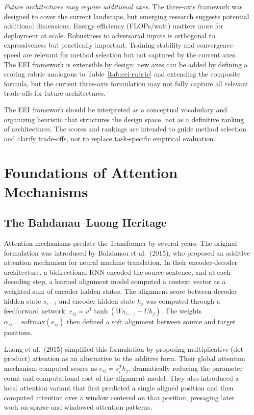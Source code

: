 \documentclass[10pt,twocolumn]{article}
\begin{document}
\textit{Future architectures may require additional axes.} The three-axis framework was designed to cover the current landscape, but emerging research suggests potential additional dimensions. Energy efficiency (FLOPs/watt) matters more for deployment at scale. Robustness to adversarial inputs is orthogonal to expressiveness but practically important. Training stability and convergence speed are relevant for method selection but not captured by the current axes. The EEI framework is extensible by design: new axes can be added by defining a scoring rubric analogous to Table~\ref{tab:eei-rubric} and extending the composite formula, but the current three-axis formulation may not fully capture all relevant trade-offs for future architectures.

\noindent The EEI framework should be interpreted as a conceptual vocabulary and organizing heuristic that structures the design space, not as a definitive ranking of architectures. The scores and rankings are intended to guide method selection and clarify trade-offs, not to replace task-specific empirical evaluation.

\section{Foundations of Attention Mechanisms}\label{foundations-of-attention-mechanisms}

\subsection{The Bahdanau--Luong Heritage}\label{the-bahdanauluong-heritage}

Attention mechanisms predate the Transformer by several years. The original formulation was introduced by Bahdanau et al.~(2015), who proposed an additive attention mechanism for neural machine translation. In their encoder-decoder architecture, a bidirectional RNN encoded the source sentence, and at each decoding step, a learned alignment model computed a context vector as a weighted sum of encoder hidden states. The alignment score between decoder hidden state $s_{i-1}$ and encoder hidden state $h_j$ was computed through a feedforward network: $e_{ij} = v^T \tanh(W s_{i-1} + U h_j)$. The weights $\alpha_{ij} = \text{softmax}(e_{ij})$ then defined a soft alignment between source and target positions.

Luong et al.~(2015) simplified this formulation by proposing multiplicative (dot-product) attention as an alternative to the additive form. Their global attention mechanism computed scores as $e_{ij} = s_i^T h_j$, dramatically reducing the parameter count and computational cost of the alignment model. They also introduced a local attention variant that first predicted a single aligned position and then computed attention over a window centered on that position, presaging later work on sparse and windowed attention patterns.
\end{document}
